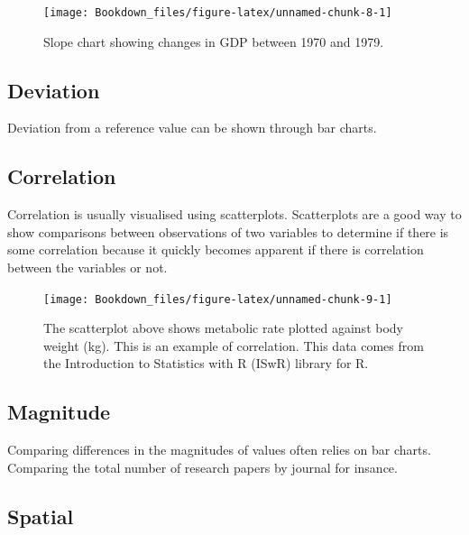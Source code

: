 \documentclass[
]{book}
\begin{document}
\begin{figure}

{\centering \texttt{[image: Bookdown\_files/figure-latex/unnamed-chunk-8-1]} 

}

\caption{Slope chart showing changes in GDP between 1970 and 1979.}\label{fig:unnamed-chunk-8}
\end{figure}

\hypertarget{deviation}{%
\subsection{Deviation}\label{deviation}}

Deviation from a reference value can be shown through bar charts.

\hypertarget{correlation}{%
\subsection{Correlation}\label{correlation}}

Correlation is usually visualised using scatterplots. Scatterplots are a good way to show comparisons between observations of two variables to determine if there is some correlation because it quickly becomes apparent if there is correlation between the variables or not.

\begin{figure}

{\centering \texttt{[image: Bookdown\_files/figure-latex/unnamed-chunk-9-1]} 

}

\caption{The scatterplot above shows metabolic rate plotted against body weight (kg). This is an example of correlation. This data comes from the Introduction to Statistics with R (ISwR) library for R.}\label{fig:unnamed-chunk-9}
\end{figure}

\hypertarget{magnitude}{%
\subsection{Magnitude}\label{magnitude}}

Comparing differences in the magnitudes of values often relies on bar charts. Comparing the total number of research papers by journal for insance.

\hypertarget{spatial}{%
\subsection{Spatial}\label{spatial}}
\end{document}

